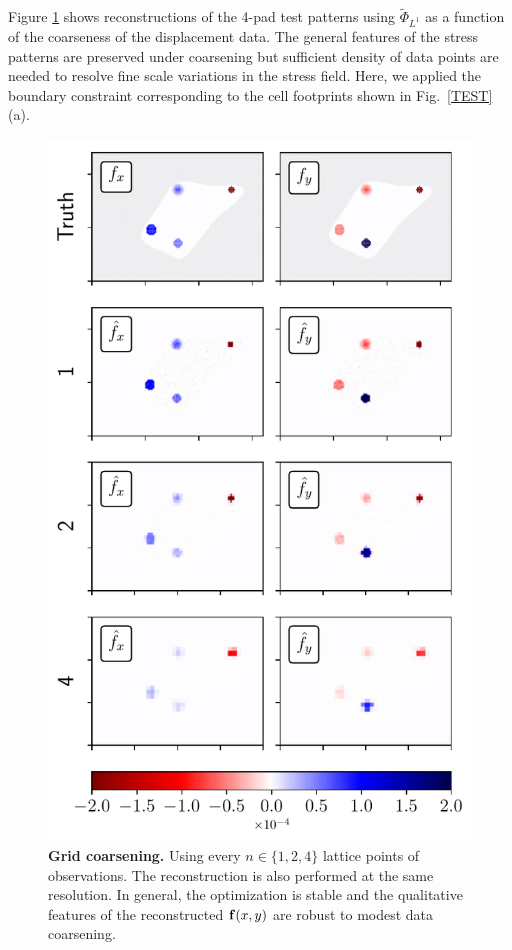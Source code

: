 \documentclass[aps,prl,reprint,twocolumn,groupedaddress,showpacs]{revtex4}
\def\f{{\bf f}}
\begin{document}
Figure \ref{GRID} shows reconstructions of the 4-pad test patterns
using $\tilde{\Phi}_{L^{1}}$ as a function of the coarseness of the
displacement data. The general features of the stress patterns are
preserved under coarsening but sufficient density of data points are
needed to resolve fine scale variations in the stress field. Here, we
applied the boundary constraint corresponding to the cell footprints
shown in Fig.~\ref{TEST}(a).

\begin{figure}
\includegraphics[width=\linewidth]{gridspacefig}
\caption{\textbf{Grid coarsening.} Using every $n\in\{1,2,4\}$
  lattice points of observations. The reconstruction is also performed
  at the same resolution.  In general, the optimization is stable and
  the qualitative features of the reconstructed $\f(x,y)$ are robust
  to modest data coarsening.}
\label{GRID}
\end{figure}
\end{document}
